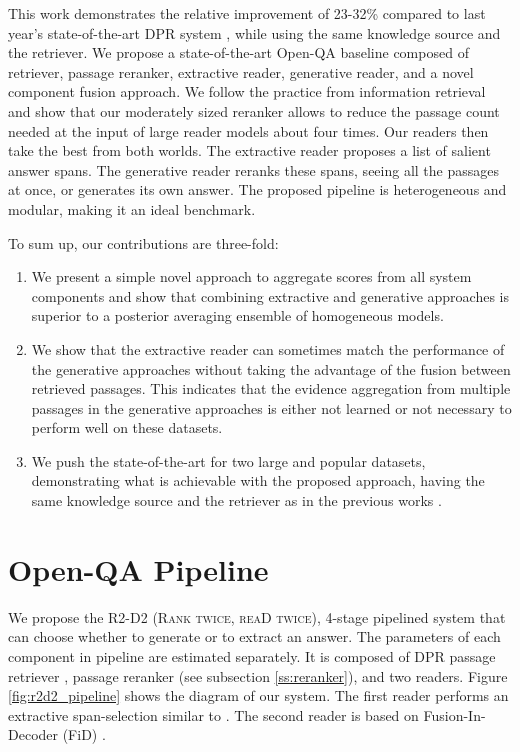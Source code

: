 \documentclass[11pt]{article}
\begin{document}
This work demonstrates the relative improvement of 23-32\% compared to last year's state-of-the-art DPR system  \cite{karpukhin2020dense}, while using the same knowledge source and the retriever. We propose a state-of-the-art Open-QA baseline composed of retriever, passage reranker, extractive reader, generative reader, and a novel component fusion approach. We follow the practice from information retrieval and show that our moderately sized reranker allows to reduce the passage count needed at the input of large reader models about four times. Our readers then take the best from both worlds. The extractive reader proposes a list of salient answer spans. The generative reader reranks these spans, seeing all the passages at once, or generates its own answer.
The proposed pipeline is heterogeneous and modular, making it an ideal benchmark. 


To sum up, our contributions are three-fold:
\begin{enumerate}
    \item We present a simple novel approach to aggregate scores from all system components and show that combining extractive and generative approaches is superior to a posterior averaging ensemble of homogeneous models.
    \item We show that the extractive reader can sometimes match the performance of the generative approaches without taking the advantage of the fusion between retrieved passages. This indicates that the evidence aggregation from multiple passages in the generative approaches is either not learned or not necessary to perform well on these datasets.
    \item We push the state-of-the-art for two large and popular datasets, demonstrating what is achievable with the proposed approach, having the same knowledge source and the retriever as in the previous works \cite{karpukhin2020dense,izacard2020leveraging}.
\end{enumerate}






\section{Open-QA Pipeline}
We propose the R2-D2 (\textsc{Rank twice}, \textsc{reaD twice}), 4-stage pipelined system that can choose whether to generate or to extract an answer.  The parameters of each component in pipeline are estimated separately. It is composed of DPR passage retriever \cite{karpukhin2020dense}, passage reranker (see subsection \ref{ss:reranker}), and two readers. Figure \ref{fig:r2d2_pipeline} shows the diagram of our system. The first reader performs an extractive span-selection similar to \citet{fajcik2020rethinking}. The second reader is based on Fusion-In-Decoder (FiD) \cite{izacard2020leveraging}.
\end{document}
